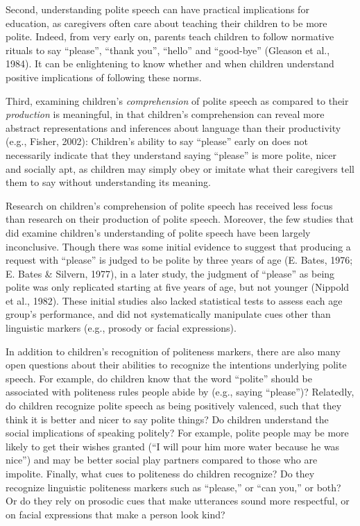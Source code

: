 \documentclass[oneside]{report}
\begin{document}
Second, understanding polite speech can have practical implications for
education, as caregivers often care about teaching their children to be
more polite. Indeed, from very early on, parents teach children to
follow normative rituals to say ``please'', ``thank you'', ``hello'' and
``good-bye'' (Gleason et al., 1984). It can be enlightening to know
whether and when children understand positive implications of following
these norms.

Third, examining children's \emph{comprehension} of polite speech as
compared to their \emph{production} is meaningful, in that children's
comprehension can reveal more abstract representations and inferences
about language than their productivity (e.g., Fisher, 2002): Children's
ability to say ``please'' early on does not necessarily indicate that
they understand saying ``please'' is more polite, nicer and socially
apt, as children may simply obey or imitate what their caregivers tell
them to say without understanding its meaning.

Research on children's comprehension of polite speech has received less
focus than research on their production of polite speech. Moreover, the
few studies that did examine children's understanding of polite speech
have been largely inconclusive. Though there was some initial evidence
to suggest that producing a request with ``please'' is judged to be
polite by three years of age (E. Bates, 1976; E. Bates \& Silvern,
1977), in a later study, the judgment of ``please'' as being polite was
only replicated starting at five years of age, but not younger (Nippold
et al., 1982). These initial studies also lacked statistical tests to
assess each age group's performance, and did not systematically
manipulate cues other than linguistic markers (e.g., prosody or facial
expressions).

In addition to children's recognition of politeness markers, there are
also many open questions about their abilities to recognize the
intentions underlying polite speech. For example, do children know that
the word ``polite'' should be associated with politeness rules people
abide by (e.g., saying ``please'')? Relatedly, do children recognize
polite speech as being positively valenced, such that they think it is
better and nicer to say polite things? Do children understand the social
implications of speaking politely? For example, polite people may be
more likely to get their wishes granted (``I will pour him more water
because he was nice'') and may be better social play partners compared
to those who are impolite. Finally, what cues to politeness do children
recognize? Do they recognize linguistic politeness markers such as
``please,'' or ``can you,'' or both? Or do they rely on prosodic cues
that make utterances sound more respectful, or on facial expressions
that make a person look kind?
\end{document}
